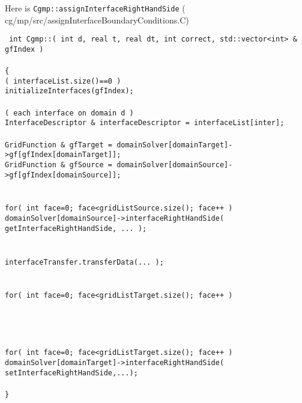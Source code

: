 Here is {\tt Cgmp::assignInterfaceRightHandSide} (  cg/mp/src/assignInterfaceBoundaryConditions.C)
\begin{flushleft}\tt\small
int Cgmp::( int d, real t, real dt, int correct, std::vector<int> \& gfIndex ) \\
 \\
\{  \\
\ia \IF( interfaceList.size()==0 ) \\
\ib     initializeInterfaces(gfIndex);  \\
\ib \\
\ia \FOR( each interface on domain d )\\
\ib    InterfaceDescriptor \& interfaceDescriptor = interfaceList[inter]; \\
\ib    {} \\
\ib    GridFunction \& gfTarget = domainSolver[domainTarget]->gf[gfIndex[domainTarget]]; \\
\ib    GridFunction \& gfSource = domainSolver[domainSource]->gf[gfIndex[domainSource]]; \\
\ib    \\
\ib    {} \\
\ib    for( int face=0; face<gridListSource.size(); face++ ) \\
\ic      domainSolver[domainSource]->interfaceRightHandSide( getInterfaceRightHandSide, ... ); \\
\ib     \\
\ib    {} \\
\ib    interfaceTransfer.transferData(... );  \\
\ib    \\
\ib    {} \\
\ib    for( int face=0; face<gridListTarget.size(); face++ ) \\
\ic      {} \\
\ic      {} \\
\ib    \\
\ib    {} \\
\ib    for( int face=0; face<gridListTarget.size(); face++ ) \\
\ic      domainSolver[domainTarget]->interfaceRightHandSide( setInterfaceRightHandSide,...); \\
\ia \\
\}
\end{flushleft}




